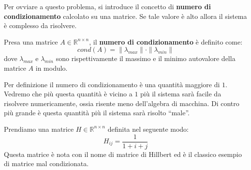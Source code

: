 Per ovviare a questo problema, si introduce il concetto di \textbf{numero di
    condizionamento} calcolato su una matrice. Se tale valore è alto allora il
sistema è complesso da risolvere.
\begin{definizione}
    Presa una matrice $A \in \mathbb{R}^{n \times n}$, il \textbf{numero di
        condizionamento} è definito come:
    \begin{equation}
        cond(A) = \|\lambda_{max}\| \cdot \|\lambda_{min}\|
    \end{equation}
    dove $\lambda_{max}$ e $\lambda_{min}$ sono rispettivamente il massimo e il
    minimo autovalore della matrice $A$ in modulo.
\end{definizione}
Per definizione il numero di condizionamento è una quantità maggiore di $1$.
Vedremo che più questa quantità è vicino a $1$ più il sistema sarà facile da
risolvere numericamente, ossia risente meno dell'algebra di macchina. Di contro
più grande è questa quantità più il sistema sarà risolto “male”.
\begin{esempio}
    Prendiamo una matrice $H \in \mathbb{R}^{n \times n}$ definita nel seguente modo:
    \begin{equation*}
        H_{ij}=\frac{1}{1+i+j}
    \end{equation*}
    Questa matrice è nota con il nome di matrice di Hillbert ed è il classico
    esempio di matrice mal condizionata. 
\end{esempio}